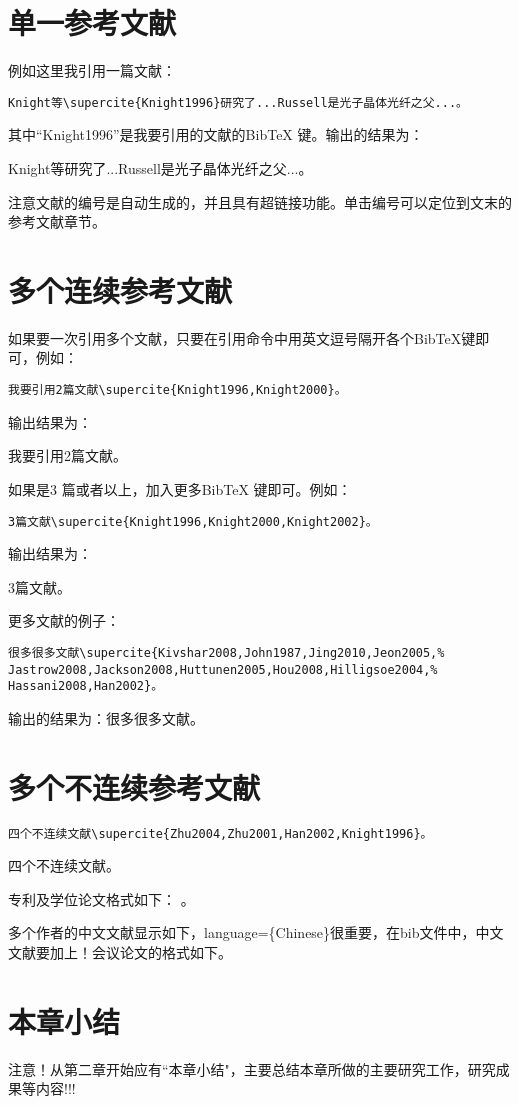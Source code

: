 \section{单一参考文献}\label{section5-1}
例如这里我引用一篇文献：
\begin{verbatim}
Knight等\supercite{Knight1996}研究了...Russell是光子晶体光纤之父...。
\end{verbatim}
其中“Knight1996”是我要引用的文献的BibTeX 键。输出的结果为：

Knight等\supercite{Knight1996}研究了...Russell是光子晶体光纤之父...。

注意文献的编号是自动生成的，并且具有超链接功能。单击编号可以定位到文末的参考文献章节。

\section{多个连续参考文献}\label{section5-2}
 如果要一次引用多个文献，只要在引用命令中用英文逗号隔开各个BibTeX键即可，例如：
 \begin{verbatim}
我要引用2篇文献\supercite{Knight1996,Knight2000}。
\end{verbatim}
输出结果为：

我要引用2篇文献\supercite{Knight1996,Knight2000}。


如果是3 篇或者以上，加入更多BibTeX 键即可。例如：
 \begin{verbatim}
3篇文献\supercite{Knight1996,Knight2000,Knight2002}。
\end{verbatim}
输出结果为：

3篇文献\supercite{Knight1996,Knight2000,Knight2002}。

更多文献的例子：
 \begin{verbatim}
很多很多文献\supercite{Kivshar2008,John1987,Jing2010,Jeon2005,%
Jastrow2008,Jackson2008,Huttunen2005,Hou2008,Hilligsoe2004,%
Hassani2008,Han2002}。
\end{verbatim}

输出的结果为：很多很多文献\supercite{John1987,Jing2010,Jeon2005,%
Jastrow2008,Jackson2008,Huttunen2005,Hou2008,Hilligsoe2004,%
Hassani2008,Han2002}。



\section{多个不连续参考文献}\label{section5-3}
 \begin{verbatim}
四个不连续文献\supercite{Zhu2004,Zhu2001,Han2002,Knight1996}。
\end{verbatim}
四个不连续文献\supercite{Zhu2004,Zhu2001,Han2002,Knight1996}。

专利及学位论文格式如下：
\cite{jxz,Yu2004,Zhao2013}。

多个作者的中文文献显示如下\cite{yaojianquan2009}，language=\{Chinese\}很重要，在bib文件中，中文文献要加上！会议论文的格式如下\cite{Li1998}。


\section{本章小结}\label{section5-4}
注意！从第二章开始应有``本章小结"，主要总结本章所做的主要研究工作，研究成果等内容!!!
